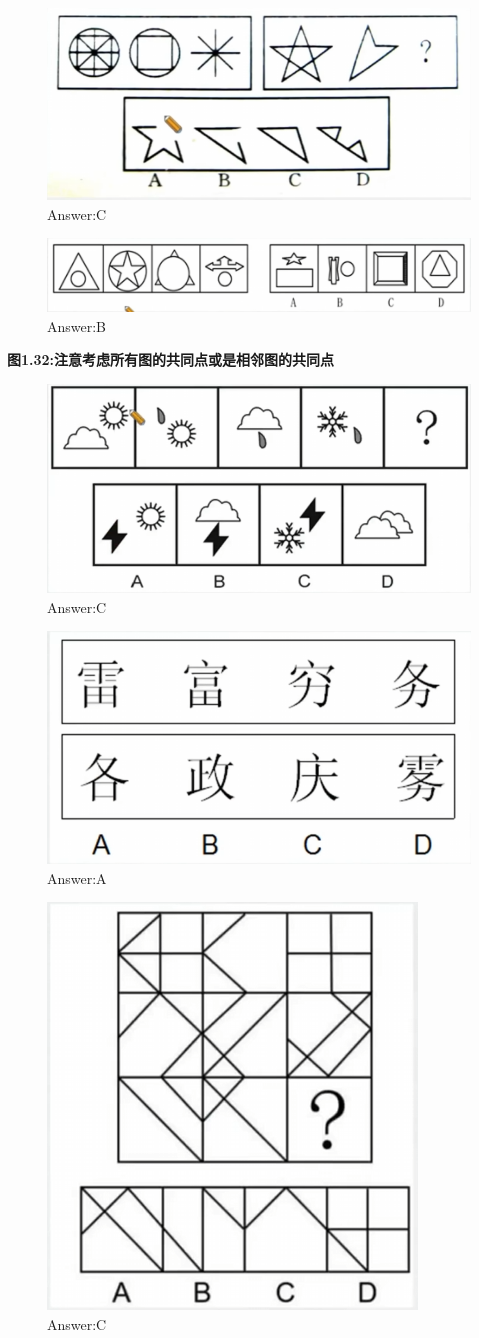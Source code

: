 \documentclass{article}
\numberwithin{equation}{section}						%
\numberwithin{figure}{section}							%
\begin{document}
\begin{sloppypar}
\begin{figure}[H]
     \centering
     \includegraphics[width=0.5\linewidth]{34.png}
		\caption{Answer:C}
\end{figure}

\begin{figure}[H]
     \centering
     \includegraphics[width=0.65\linewidth]{35.png}
		\caption{Answer:B}
\end{figure}

\textbf{图1.32:注意考虑所有图的共同点或是相邻图的共同点}

\begin{figure}[H]
     \centering
     \includegraphics[width=0.5\linewidth]{36.png}
		\caption{Answer:C}
\end{figure}


\begin{figure}[H]
     \centering
     \includegraphics[width=0.5\linewidth]{37.png}
		\caption{Answer:A}
\end{figure}


\begin{figure}[H]
     \centering
     \includegraphics[width=0.4\linewidth]{38.png}
		\caption{Answer:C}
\end{figure}



\end{sloppypar}
\end{document}
